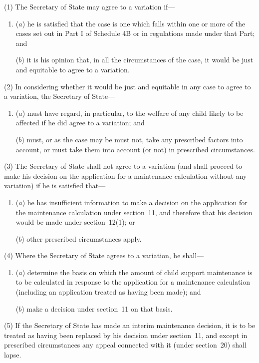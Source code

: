 \documentclass[12pt,a4paper]{article}
\begin{document}
(1) The Secretary of State may agree to a variation if—
\begin{enumerate}\item[]
($a$) he is satisfied that the case is one which falls within one or more of the cases set out in Part I of Schedule 4B or in regulations made under that Part; and

($b$) it is his opinion that, in all the circumstances of the case, it would be just and equitable to agree to a variation.
\end{enumerate}

(2) In considering whether it would be just and equitable in any case to agree to a variation, the Secretary of State—
\begin{enumerate}\item[]
($a$) must have regard, in particular, to the welfare of any child likely to be affected if he did agree to a variation; and

($b$) must, or as the case may be must not, take any prescribed factors into account, or must take them into account (or not) in prescribed circumstances.
\end{enumerate}

(3) The Secretary of State shall not agree to a variation (and shall proceed to make his decision on the application for a maintenance calculation without any variation) if he is satisfied that—
\begin{enumerate}\item[]
($a$) he has insufficient information to make a decision on the application for the maintenance calculation under section~11, and therefore that his decision would be made under section~12(1); or

($b$) other prescribed circumstances apply.
\end{enumerate}

(4) Where the Secretary of State agrees to a variation, he shall—
\begin{enumerate}\item[]
($a$) determine the basis on which the amount of child support maintenance is to be calculated in response to the application for a maintenance calculation (including an application treated as having been made); and

($b$) make a decision under section~11 on that basis.
\end{enumerate}

(5) If the Secretary of State has made an interim maintenance decision, it is to be treated as having been replaced by his decision under section~11, and except in prescribed circumstances any appeal connected with it (under section~20) shall lapse.
\end{document}
